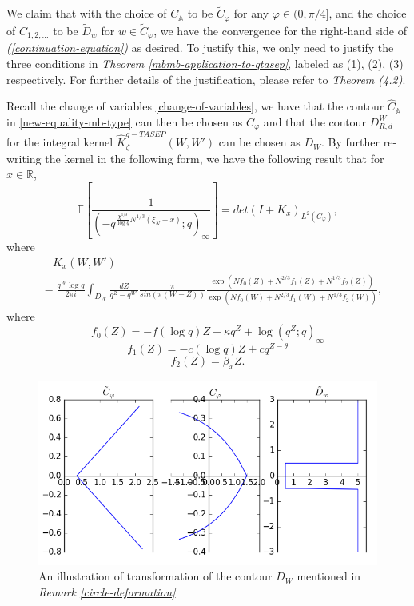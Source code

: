 We claim that with the choice of $C_{\mathbb{A}}$ to be $\tilde{C}_{\varphi}$ for any $\varphi \in (0, \pi / 4]$, and the choice of $C_{1, 2, \dots}$ to be $\tilde{D}_{w}$ for $w \in \tilde{C}_{\varphi}$, we have the convergence for the right-hand side of \textit{(\ref{continuation-equation})} as desired. To justify this, we only need to justify the three conditions in \textit{Theorem \ref{mbmb-application-to-qtasep}}, labeled as (1), (2), (3) respectively. For further details of the justification, please refer to \textit{\cite{asymptotics2013} Theorem (4.2)}.

Recall the change of variables \eqref{change-of-variables}, we have that the contour $\hat{C}_{\mathbb{A}}$ in \eqref{new-equality-mb-type} can then be chosen as $C_{\varphi}$ and that the contour $D_{R,d}^W$ for the integral kernel $\hat{K}_{\zeta}^{q-TASEP}(W,W')$ can be chosen as $D_W$. By further re-writing the kernel in the following form, we have the following result that for $x \in \mathbb{R}$, 
\begin{equation}
\label{new-equality-mb-type-2}
\mathbb{E} \left[ \frac{1}{( -q^{ \frac{\chi^{1/3}}{\log q} N^{1/3} (\xi_N - x) }; q )_{\infty}} \right] = det(I+K_x)_{L^2(C_{\varphi})},
\end{equation}
where 
\begin{align*}
& \quad K_x(W,W') \\
& = \frac{q^W \log q}{2 \pi i} \int_{D_W} \frac{dZ}{q^Z - q^{W'}} \frac{\pi}{sin(\pi (W-Z))} \frac{\exp(Nf_0(Z) + N^{2/3} f_1(Z) + N^{1/3} f_2(Z))}{\exp(Nf_0(W) + N^{2/3} f_1(W) + N^{1/3} f_2(W))},
\end{align*}
where
\begin{equation*}
f_0(Z) = -f (\log q) Z + \kappa q^Z + \log(q^Z; q)_{\infty}
\end{equation*}
\begin{equation*}
f_1(Z) = -c (\log q) Z + cq^{Z - \theta}
\end{equation*}
\begin{equation*}
f_2(Z) = \beta_x Z.
\end{equation*}

\begin{figure}
	\centering
	\includegraphics[width=\textwidth]{contour-cphi}
	\caption[Contour replacement of $D_W$]
	{An illustration of transformation of the contour $D_W$ mentioned in \textit{Remark \ref{circle-deformation}}}
	\label{fig:contour-dw-circle}
\end{figure}

